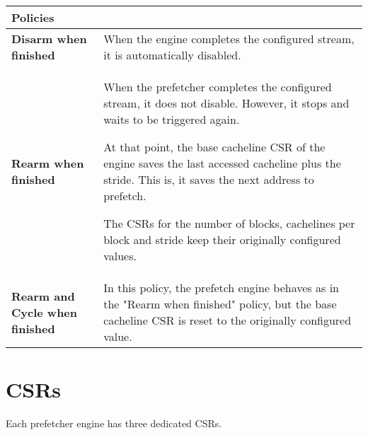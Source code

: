 \documentclass[10pt,titlepage,twoside]{book}
\begin{document}
\begin{tabular}{p{.3\linewidth}p{.65\linewidth}}
\toprule
\textbf{Policies}
& \\
\midrule
\textbf{Disarm when finished}
& When the engine completes the configured stream, it is automatically disabled.\\
\midrule

\textbf{Rearm when finished}
& When the prefetcher completes the configured stream, it does not disable.
However, it stops and waits to be triggered again.

At that point, the base cacheline \ac{CSR} of the engine saves the last accessed cacheline plus the stride.
This is, it saves the next address to prefetch.

The \acp{CSR} for the number of blocks, cachelines per block and stride keep their originally configured values.\\
\midrule

\textbf{Rearm and Cycle when finished}
& In this policy, the prefetch engine behaves as in the "Rearm when finished" policy, but the base cacheline \ac{CSR} is reset to the originally configured value.\\

\end{tabular}

\section{CSRs}

Each prefetcher engine has three dedicated \acp{CSR}.
\end{document}
